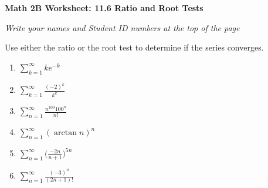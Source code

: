 \documentclass[12pt,fleqn]{article}
\begin{document}
\begin{center}
	\textbf{Math 2B Worksheet: 11.6 Ratio and Root Tests}
\end{center}

\emph{Write your names and Student ID numbers at the top of the page}

Use either the ratio or the root test to determine if the series converges.
\begin{enumerate}
\item $\displaystyle \sum_{k=1}^\infty ke^{-k}$\vfill


\item $\displaystyle \sum_{k=1}^\infty\frac{(-2)^k}{k^k}$\vfill

\item $\displaystyle \sum_{n=1}^\infty\frac{n^{100} 100^n}{n!}$\vfill

\newpage

\item $\displaystyle \sum_{n=1}^\infty(\arctan n)^n$\vfill

\item $\displaystyle \sum_{n=1}^\infty\bigg(\frac{-2n}{n+1}\bigg)^{5n}$\vfill

\item $\displaystyle \sum_{n=1}^\infty\frac{(-3)^n}{(2n+1)!}$\vfill





\end{enumerate}
\end{document}
